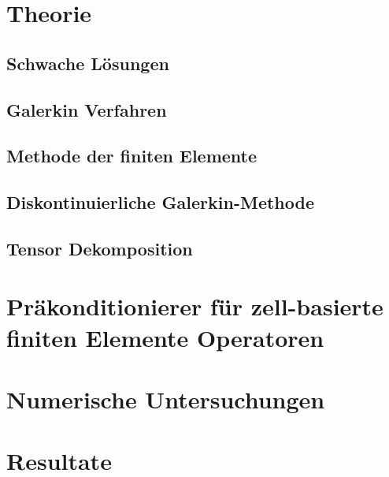\documentclass[12pt,a4paper]{scrartcl}
\numberwithin{equation}{section}
\begin{document}
\section{Theorie}
\newpage
\subsection{Schwache Lösungen}


\newpage
\subsection{Galerkin Verfahren}


\newpage
\subsection{Methode der finiten Elemente}


\newpage
\subsection{Diskontinuierliche Galerkin-Methode}


\newpage
\subsection{Tensor Dekomposition}





\section{Präkonditionierer für zell-basierte finiten Elemente Operatoren }




\section{Numerische Untersuchungen}




\section{Resultate}





\newpage




 



\end{document}
